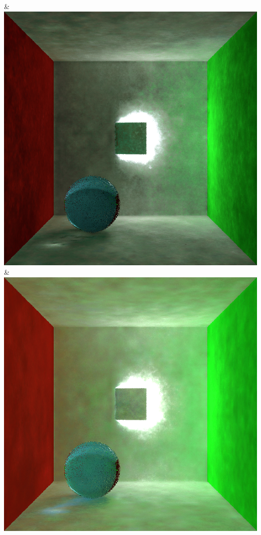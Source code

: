 & \includegraphics[width=\linewidth]{figures/py/tests/quality_comparison/nrc+pt_1spp_ajar_caustic.png}
& \includegraphics[width=\linewidth]{figures/py/tests/quality_comparison/nrc+pt+sl_1spp_ajar_caustic.png}

